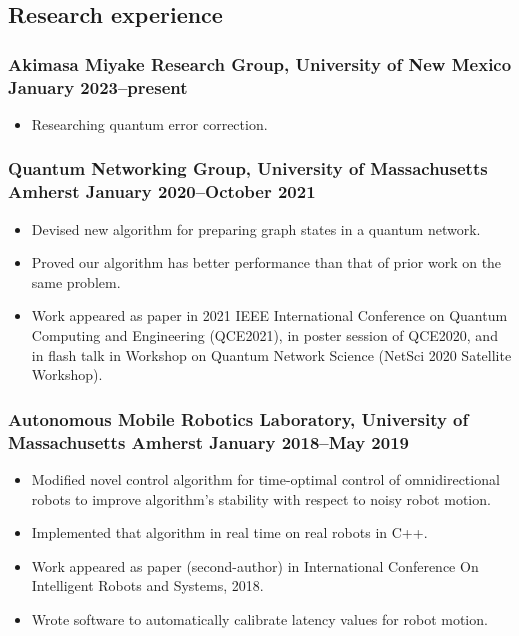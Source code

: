 \documentclass{article}
\begin{document}
	\subsection*{Research experience}
		\subsubsection*{Akimasa Miyake Research Group, University of New Mexico \hfill \normalfont \normalsize January 2023--present}
			\begin{itemize}
				\item Researching quantum error correction.
			\end{itemize}
		\subsubsection*{Quantum Networking Group, University of Massachusetts Amherst \hfill \normalfont \normalsize January 2020--October 2021}
			\begin{itemize}
				\item Devised new algorithm for preparing graph states in a quantum network.
				\item Proved our algorithm has better performance than that of prior work on the same problem.
				\item Work appeared as paper in 2021 IEEE International Conference on Quantum Computing and Engineering (QCE2021), in poster session of QCE2020, and in flash talk in Workshop on Quantum Network Science (NetSci 2020 Satellite Workshop).
			\end{itemize}
		\subsubsection*{Autonomous Mobile Robotics Laboratory, University of Massachusetts Amherst \hfill \normalfont \normalsize January 2018--May 2019}
			\begin{itemize}
				\item Modified novel control algorithm for time-optimal control of omnidirectional robots to improve algorithm's stability with respect to noisy robot motion.
				\item Implemented that algorithm in real time on real robots in C++.
				\item Work appeared as paper (second-author) in International Conference On Intelligent Robots and Systems, 2018.
				\item Wrote software to automatically calibrate latency values for robot motion.
			\end{itemize}
\end{document}
